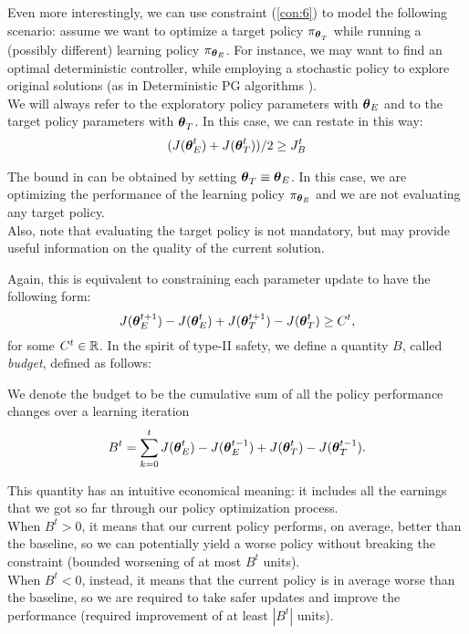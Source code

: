 Even more interestingly, we can use constraint (\ref{con:6}) to model the following scenario: assume we want to optimize a target policy $\pi_{\vtarget[]}$ while running a (possibly different) learning policy $\pi_{\vtheta_E}$. For instance, we may want to find an optimal deterministic controller, while employing a stochastic policy to explore original solutions (as in Deterministic PG algorithms \cite{silver2014deterministic}). \\
We will always refer to the exploratory policy parameters with $\vtheta_E$ and to the target policy parameters with $\vtarget[]$. In this case, we can restate  in this way:
\begin{align}\label{con:6target}
(J(\vtheta_E^t) + J(\vtarget))/2 \geq \jbase
\end{align}

\begin{note}
The bound in  can be obtained by setting $\vtarget[] \equiv \vtheta_E$. In this case, we are optimizing the performance of the learning policy $\pi_{\vtheta_E}$ and we are not evaluating any target policy.\\
Also, note that evaluating the target policy is not mandatory, but may provide useful information on the quality of the current solution.
\end{note}

Again, this is equivalent to constraining each parameter update to have the following form:
\begin{equation}\label{con:type2}
J(\vtheta_E^{t+1}) - J(\vtheta_E^{t}) + J(\vtarget[t+1]) - J(\vtarget) \geq C^t,
\end{equation}
for some $C^t\in \realspace$.
%
In the spirit of type-II safety, we define a quantity $B$, called \textit{budget}, defined as follows:
\begin{definition}[Budget] We denote the budget to be the cumulative sum of all the policy performance changes over a learning iteration
\begin{equation}\label{eq:budget}
B^t =  \sum_{k=0}^{t} J(\vtheta_E^t) - J(\vtheta_E^{t-1}) + J(\vtarget) - J(\vtarget[t-1]).
\end{equation}
\end{definition}
This quantity has an intuitive economical meaning: it includes all the earnings that we got so far through our policy optimization process.\\ 
When $B^t > 0$, it means that our current policy performs, on average, better than the baseline, so we can potentially yield a worse policy without breaking the constraint (bounded worsening of at most $B^t$ units).\\
When $B^t<0$, instead, it means that the current policy is in average worse than the baseline, so we are required to take safer updates and improve the performance (required improvement of at least $|B^t|$ units). 

